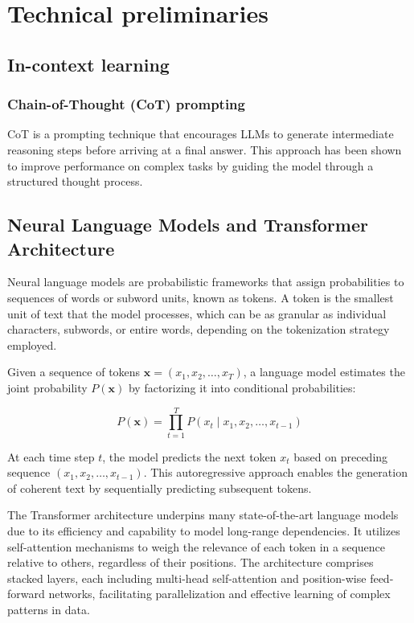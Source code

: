 
\section{Technical preliminaries} \label{app:technicality}

\subsection{In-context learning} \label{sec:icl-info}

\subsubsection{Chain-of-Thought (CoT) prompting} CoT \citep{weiChainofThoughtPromptingElicits2022} is a prompting technique that encourages LLMs to generate intermediate reasoning steps before arriving at a final answer. This approach has been shown to improve performance on complex tasks by guiding the model through a structured thought process.

\subsection{Neural Language Models and Transformer Architecture} \label{app:llm-transformer}

Neural language models are probabilistic frameworks that assign probabilities to sequences of words or subword units, known as tokens. A token is the smallest unit of text that the model processes, which can be as granular as individual characters, subwords, or entire words, depending on the tokenization strategy employed.

Given a sequence of tokens \( \mathbf{x} = (x_1, x_2, \ldots, x_T) \), a language model estimates the joint probability \( P(\mathbf{x}) \) by factorizing it into conditional probabilities:

\begin{equation}
P(\mathbf{x}) = \prod_{t=1}^T P(x_t \mid x_1, x_2, \ldots, x_{t-1})
\end{equation}

At each time step \( t \), the model predicts the next token \( x_t \) based on preceding sequence \( (x_1, x_2, \ldots, x_{t-1}) \). This autoregressive approach enables the generation of coherent text by sequentially predicting subsequent tokens.

The Transformer architecture underpins many state-of-the-art language models due to its efficiency and capability to model long-range dependencies. It utilizes self-attention mechanisms to weigh the relevance of each token in a sequence relative to others, regardless of their positions. The architecture comprises stacked layers, each including multi-head self-attention and position-wise feed-forward networks, facilitating parallelization and effective learning of complex patterns in data.

